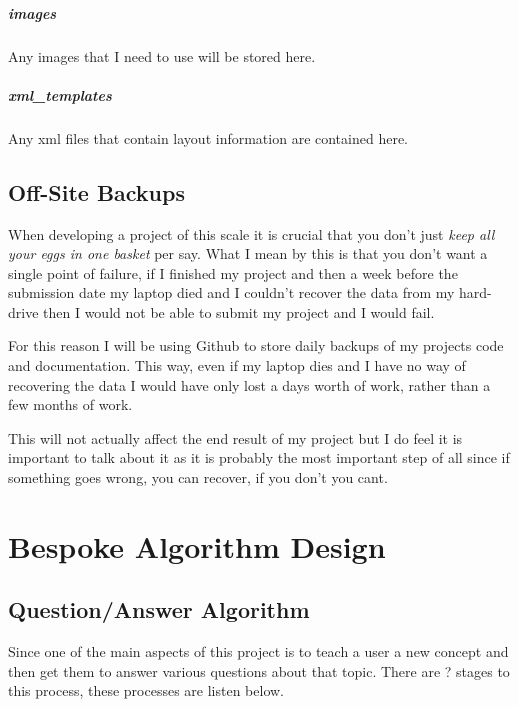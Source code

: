 \subparagraph{images}

Any images that I need to use will be stored here.

\subparagraph{xml\_templates}

Any xml files that contain layout information are contained here.

\subsection{Off-Site Backups}

When developing a project of this scale it is crucial that you don't just \textit{keep all your eggs in one basket} per say. What I mean by this is that you don't want a single point of failure, if I finished my project and then a week before the submission date my laptop died and I couldn't recover the data from my hard-drive then I would not be able to submit my project and I would fail.

For this reason I will be using Github to store daily backups of my projects code and documentation. This way, even if my laptop dies and I have no way of recovering the data I would have only lost a days worth of work, rather than a few months of work. 

This will not actually affect the end result of my project but I do feel it is important to talk about it as it is probably the most important step of all since if something goes wrong, you can recover, if you don't you cant. 

\section{Bespoke Algorithm Design}

\subsection{Question/Answer Algorithm}

Since one of the main aspects of this project is to teach a user a new concept and then get them to answer various questions about that topic. There are {?} stages to this process, these processes are listen below.

